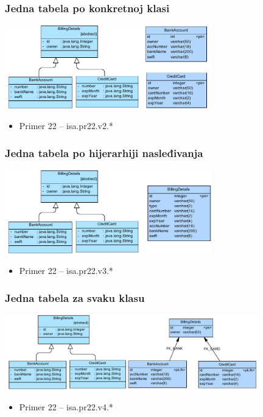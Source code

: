 \documentclass[compress]{beamer}
\begin{document}
\begin{frame}
  \frametitle{Jedna tabela po konkretnoj klasi}
  \begin{center}
    \includegraphics[width=9cm]{pic11.pdf}
  \end{center}
  \begin{itemize}
    \item Primer 22 -- isa.pr22.v2.*
  \end{itemize}
\end{frame}
\begin{frame}
  \frametitle{Jedna tabela po hijerarhiji nasleđivanja}
  \begin{center}
    \includegraphics[width=9cm]{pic12.pdf}
  \end{center}
  \begin{itemize}
    \item Primer 22 -- isa.pr22.v3.*
  \end{itemize}
\end{frame}
\begin{frame}
  \frametitle{Jedna tabela za svaku klasu}
  \begin{center}
    \includegraphics[width=11cm]{pic13.pdf}
  \end{center}
  \begin{itemize}
    \item Primer 22 -- isa.pr22.v4.*
  \end{itemize}
\end{frame}
\end{document}
